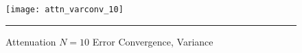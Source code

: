 \begin{figure}[H]
  \centering
    \texttt{[image: attn\_varconv\_10]}
    \rule{35em}{0.5pt}
  \caption{Attenuation $N=10$ Error Convergence, Variance}
  \label{fig:att10_varconv}
\end{figure}



%


